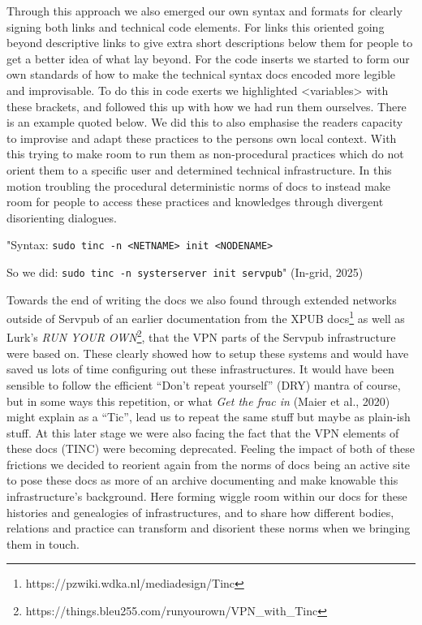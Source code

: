 Through this approach we also emerged our own syntax and formats for
clearly signing both links and technical code elements. For links this
oriented going beyond descriptive links to give extra short descriptions
below them for people to get a better idea of what lay beyond. For the
code inserts we started to form our own standards of how to make the
technical syntax docs encoded more legible and improvisable. To do this
in code exerts we highlighted \textless variables\textgreater{} with
these brackets, and followed this up with how we had run them ourselves.
There is an example quoted below. We did this to also emphasise the
readers capacity to improvise and adapt these practices to the persons
own local context. With this trying to make room to run them as
non-procedural practices which do not orient them to a specific user and
determined technical infrastructure. In this motion troubling the
procedural deterministic norms of docs to instead make room for people
to access these practices and knowledges through divergent disorienting
dialogues.

"Syntax:
\texttt{sudo\ tinc\ -n\ \textless{}NETNAME\textgreater{}\ init\ \textless{}NODENAME\textgreater{}}

So we did: \texttt{sudo\ tinc\ -n\ systerserver\ init\ servpub}"
(In-grid, 2025)

Towards the end of writing the docs we also found through extended
networks outside of Servpub of an earlier documentation from the XPUB
docs\footnote{https://pzwiki.wdka.nl/mediadesign/Tinc} as well as Lurk's
\emph{RUN YOUR OWN}\footnote{https://things.bleu255.com/runyourown/VPN\_with\_Tinc},
that the VPN parts of the Servpub infrastructure were based on. These
clearly showed how to setup these systems and would have saved us lots
of time configuring out these infrastructures. It would have been
sensible to follow the efficient ``Don't repeat yourself'' (DRY) mantra
of course, but in some ways this repetition, or what \emph{Get the frac
in} (Maier et al., 2020) might explain as a ``Tic'', lead us to repeat
the same stuff but maybe as plain-ish stuff. At this later stage we were
also facing the fact that the VPN elements of these docs (TINC) were
becoming deprecated. Feeling the impact of both of these frictions we
decided to reorient again from the norms of docs being an active site to
pose these docs as more of an archive documenting and make knowable this
infrastructure's background. Here forming wiggle room within our docs
for these histories and genealogies of infrastructures, and to share how
different bodies, relations and practice can transform and disorient
these norms when we bringing them in touch.

